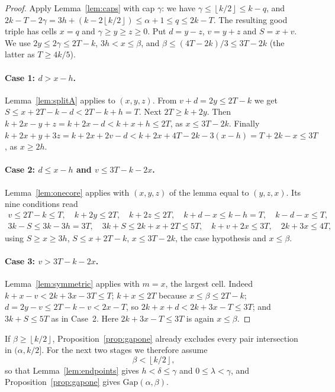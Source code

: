 \documentclass[11pt]{article}
\numberwithin{equation}{section}
\theoremstyle{definition}
\theoremstyle{remark}
\newcommand{\floor}[1]{\left\lfloor #1\right\rfloor}
\newcommand{\Gap}{\mathrm{Gap}}
\begin{document}
\begin{proof}
Apply Lemma~\ref{lem:caps} with cap $\gamma$: we have
$\gamma\le\floor{k/2}\le k-q$, and
$2k-T-2\gamma=3h+(k-2\floor{k/2})\le\alpha+1\le q\le2k-T$. The resulting
good triple has cells $x=q$ and $\gamma\ge y\ge z\ge0$. Put $d=y-z$,
$v=y+z$ and $S=x+v$. We use $2y\le2\gamma\le2T-k$, $3h<x\le\beta$, and
$\beta\le(4T-2k)/3\le3T-2k$ (the latter as $T\ge4k/5$).

\paragraph{Case 1: $d>x-h$.} Lemma~\ref{lem:splitA} applies to $(x,y,z)$.
From $v+d=2y\le2T-k$ we get $S\le x+2T-k-d<2T-k+h=T$. Next $2T\ge k+2y$.
Then $k+2x-y+z=k+2x-d<k+x+h\le2T$, as $x\le3T-2k$. Finally
$k+2x+y+3z=k+2x+2v-d<k+2x+4T-2k-3(x-h)=T+2k-x\le3T$, as $x\ge2h$.

\paragraph{Case 2: $d\le x-h$ and $v\le3T-k-2x$.} Lemma~\ref{lem:onecore}
applies with $(x,y,z)$ of the lemma equal to $(y,z,x)$. Its nine
conditions read
\begin{gather*}
 v\le2T-k\le T,\quad k+2y\le2T,\quad k+2z\le2T,\quad
 k+d-x\le k-h=T,\quad k-d-x\le T,\\
 3k-S\le3k-3h=3T,\quad 3k+S\le2k+x+2T\le5T,\quad k+v+2x\le3T,\quad
 2k+3x\le4T,
\end{gather*}
using $S\ge x\ge3h$, $S\le x+2T-k$, $x\le3T-2k$, the case hypothesis
and $x\le\beta$.

\paragraph{Case 3: $v>3T-k-2x$.} Lemma~\ref{lem:symmetric} applies with
$m=x$, the largest cell. Indeed $k+x-v<2k+3x-3T\le T$; $k+x\le2T$ because
$x\le\beta\le2T-k$; $d=2y-v\le2T-k-v<2x-T$, so $2k+x+d<2k+3x-T\le3T$; and
$3k+S\le5T$ as in Case~2. Here $2k+3x-T\le3T$ is again $x\le\beta$.
\end{proof}

If $\beta\ge\floor{k/2}$, Proposition~\ref{prop:gapone} already excludes
every pair intersection in $(\alpha,k/2]$. For the next two stages we
therefore assume
\begin{equation}\label{eq:branch}
 \beta<\floor{k/2},
\end{equation}
so that Lemma~\ref{lem:endpoints} gives $h<\delta\le\gamma$ and
$0\le\lambda<\gamma$, and Proposition~\ref{prop:gapone} gives
$\Gap(\alpha,\beta)$.
\end{document}
